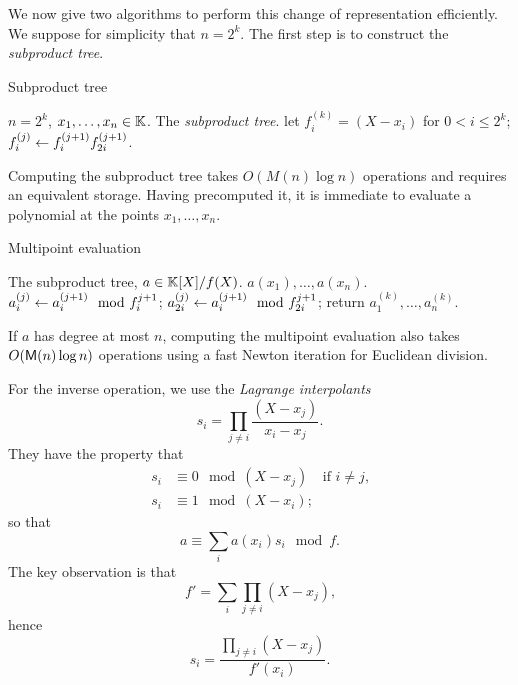 We now give two algorithms to perform this change of representation
efficiently. We suppose for simplicity that $n=2^k$. The first step is
to construct the \textit{subproduct tree}.

\begin{algorithm}
  \caption{\label{alg:subprod}Subproduct tree}
  \begin{algorithmic}[1]
    \REQUIRE $n=2^k$, $x_1,\ldots,x_n\in\mathbb{K}$.
    \ENSURE The \emph{subproduct tree}.
    \STATE let $f_i^{(k)}=(X-x_i)$ for $0<i\le2^k$;
    \STATE $f^{(j)}_i \leftarrow f^{(j+1)}_if^{(j+1)}_{2i}$.
    \ENDFOR
    \ENDFOR
  \end{algorithmic}
\end{algorithm}

Computing the subproduct tree takes $O(M(n)\log n)$ operations and
requires an equivalent storage. Having precomputed it, it is immediate
to evaluate a polynomial at the points $x_1,\ldots,x_n$.

\begin{algorithm}
  \caption{Multipoint evaluation}
  \begin{algorithmic}[1]
    \REQUIRE The subproduct tree, $a\in\mathbb{K}[X]/f(X)$.
    \ENSURE $a(x_1),\ldots,a(x_n)$.
    \STATE $a_i^{(j)} \leftarrow a_i^{(j+1)} \mod f_{i}^{j+1}$;
    \STATE $a_{2i}^{(j)} \leftarrow a_i^{(j+1)} \mod f_{2i}^{j+1}$;
    \ENDFOR
    \ENDFOR
    \STATE return $a_1^{(k)},\ldots,a_n^{(k)}$.
  \end{algorithmic}
\end{algorithm}

If $a$ has degree at most $n$, computing the multipoint evaluation
also takes $O(\mathsf{M}(n)\log n)$ operations using a fast Newton
iteration for Euclidean division.

For the inverse operation, we use the
\textit{Lagrange interpolants} 
\begin{equation}
  \label{eq:223}
  s_i = \prod_{j\ne i}\frac{(X-x_j)}{x_i-x_j}
  \text{.}
\end{equation}
They have the property that
\begin{equation}
  \label{eq:224}
  \begin{aligned}
    s_i &\equiv 0 \mod (X-x_j) &\text{if $i\ne j$,}\\
    s_i &\equiv 1 \mod (X-x_i)\text{;}
  \end{aligned}
\end{equation}
so that
\begin{equation}
  \label{eq:225}
  a \equiv \sum_i a(x_i)s_i \mod f
  \text{.}
\end{equation}
The key observation is that
\begin{equation}
  \label{eq:226}
  f' = \sum_{i}\prod_{j\ne i}(X-x_j)
  \text{,}
\end{equation}
hence
\begin{equation}
  \label{eq:227}
  s_i = \frac{\prod_{j\ne i}(X-x_j)}{f'(x_i)}
  \text{.}
\end{equation}


